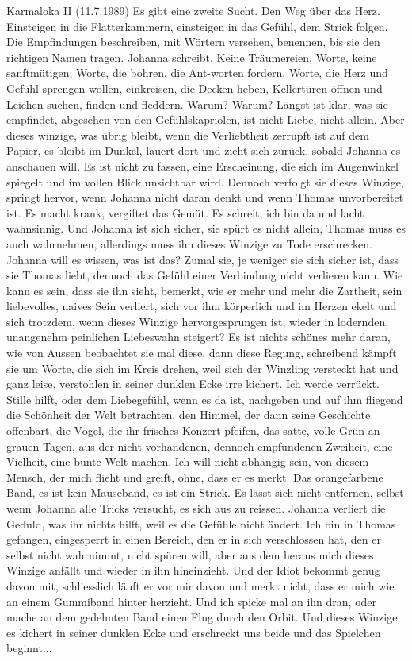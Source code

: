 Karmaloka II (11.7.1989)
Es gibt eine zweite Sucht. Den Weg über das Herz. Einsteigen in die Flatterkammern, einsteigen in das Gefühl, dem Strick folgen. Die Empfindungen beschreiben, mit Wörtern versehen, benennen, bis sie den richtigen Namen tragen. Johanna schreibt. Keine Träumereien, Worte, keine sanftmütigen; Worte, die bohren, die Ant-worten fordern, Worte, die Herz und Gefühl sprengen wollen, einkreisen, die Decken heben, Kellertüren öffnen und Leichen suchen, finden und fleddern. Warum? Warum?
Längst ist klar, was sie empfindet, abgesehen von den Gefühlskapriolen, ist nicht Liebe, nicht allein. Aber dieses winzige, was übrig bleibt, wenn die Verliebtheit zerrupft ist auf dem Papier, es bleibt im Dunkel, lauert dort und zieht sich zurück, sobald Johanna es anschauen will. Es ist nicht zu fassen, eine Erscheinung, die sich im Augenwinkel spiegelt und im vollen Blick unsichtbar wird. Dennoch verfolgt sie dieses Winzige, springt hervor, wenn Johanna nicht daran denkt und wenn Thomas unvorbereitet ist. Es macht krank, vergiftet das Gemüt. Es schreit, ich bin da und lacht wahnsinnig. Und Johanna ist sich sicher, sie spürt es nicht allein, Thomas muss es auch wahrnehmen, allerdings muss ihn dieses Winzige zu Tode erschrecken.
Johanna will es wissen, was ist das? Zumal sie, je weniger sie sich sicher ist, dass sie Thomas liebt, dennoch das Gefühl einer Verbindung nicht verlieren kann. Wie kann es sein, dass sie ihn sieht, bemerkt, wie er mehr und mehr die Zartheit, sein liebevolles, naives Sein verliert, sich vor ihm körperlich und im Herzen ekelt und sich trotzdem, wenn dieses Winzige hervorgesprungen ist, wieder in lodernden, unangenehm peinlichen Liebeswahn steigert? Es ist nichts schönes mehr daran, wie von Aussen beobachtet sie mal diese, dann diese Regung, schreibend kämpft sie um Worte, die sich im Kreis drehen, weil sich der Winzling versteckt hat und ganz leise, verstohlen in seiner dunklen Ecke irre kichert.
Ich werde verrückt. 
Stille hilft, oder dem Liebegefühl, wenn es da ist, nachgeben und auf ihm fliegend die Schönheit der Welt betrachten, den Himmel, der dann seine Geschichte offenbart, die Vögel, die ihr frisches Konzert pfeifen, das satte, volle Grün an grauen Tagen, aus der nicht vorhandenen, dennoch empfundenen Zweiheit, eine Vielheit, eine bunte Welt machen.
Ich will nicht abhängig sein, von diesem Mensch, der mich flieht und greift, ohne, dass er es merkt. Das orangefarbene Band, es ist kein Mauseband, es ist ein Strick. Es lässt sich nicht entfernen, selbst wenn Johanna alle Tricks versucht, es sich aus zu reissen. 
Johanna verliert die Geduld, was ihr nichts hilft, weil es die Gefühle nicht ändert. Ich bin in Thomas gefangen, eingesperrt in einen Bereich, den er in sich verschlossen hat, den er selbst nicht wahrnimmt, nicht spüren will, aber aus dem heraus mich dieses Winzige anfällt und wieder in ihn hineinzieht. Und der Idiot bekommt genug davon mit, schliesslich läuft er vor mir davon und merkt nicht, dass er mich wie an einem Gummiband hinter herzieht. Und ich spicke mal an ihn dran, oder mache an dem gedehnten Band einen Flug durch den Orbit. Und dieses Winzige, es kichert in seiner dunklen Ecke und erschreckt uns beide und das Spielchen beginnt...
